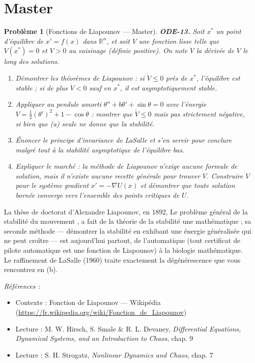 \documentclass[11pt]{article}
\newtheorem{problem}{Problème}
\newenvironment{refs}{\par\small\noindent\emph{Références :}\begin{itemize}\setlength\itemsep{0pt}}{\end{itemize}\normalsize}
\begin{document}
\bigskip


\section*{Master}

\begin{problem}[{Fonctions de Liapounov --- Master}]
\textbf{ODE-13.} Soit $ x^* $ un point d'équilibre de $ x' = f(x) $ dans
$ \mathbb{R}^n $, et soit $ V $ une fonction lisse telle que $ V(x^*) = 0 $ et
$ V >0 $ au voisinage (définie positive). On note $ \dot{V} $ la dérivée de $ V $ le
long des solutions.
\begin{enumerate}
\item[(a)] Démontrer les théorèmes de Liapounov : si $ \dot{V} \le 0 $ près de $ x^* $, l'équilibre
est stable ; si de plus $ \dot{V} <0 $ sauf en $ x^* $, il est asymptotiquement
stable.
\item[(b)] Appliquer au pendule amorti $ \theta'' + b\theta' + \sin\theta = 0 $ avec l'énergie
$ V = \frac{1}{2}(\theta')^2 + 1 - \cos\theta $ : montrer que $ \dot{V} \le 0 $ mais
\textit{pas} strictement négative, si bien que (a) seule ne donne que la stabilité.
\item[(c)] Énoncer le principe d'invariance de LaSalle et s'en servir pour conclure malgré tout à la
stabilité asymptotique de l'équilibre bas.
\item[(d)] Expliquer le marché : la méthode de Liapounov n'exige aucune formule de solution, mais il
n'existe aucune recette générale pour trouver $ V $. Construire $ V $ pour le système
gradient $ x' = -\nabla U(x) $ et démontrer que toute solution bornée converge vers l'ensemble
des points critiques de $ U $.
\end{enumerate}

\end{problem}

\noindent La thèse de doctorat d'Alexandre Liapounov, en 1892, \og{} Le problème général de
la stabilité du mouvement \fg{}, a fait de la théorie de la stabilité une mathématique ; sa
\og{} seconde méthode \fg{} --- démontrer la stabilité en exhibant une énergie généralisée qui ne peut
croître --- est aujourd'hui partout, de l'automatique (tout certificat de pilote automatique est une
fonction de Liapounov) à la biologie mathématique. Le raffinement de LaSalle (1960) traite
exactement la dégénérescence que vous rencontrez en (b).

\begin{refs}
\item Contexte : Fonction de Liapounov --- Wikipédia (\url{https://fr.wikipedia.org/wiki/Fonction_de_Liapounov})
\item Lecture : M. W. Hirsch, S. Smale \& R. L. Devaney, \textit{Differential Equations, Dynamical Systems, and an Introduction to Chaos}, chap. 9
\item Lecture : S. H. Strogatz, \textit{Nonlinear Dynamics and Chaos}, chap. 7
\end{refs}
\end{document}
